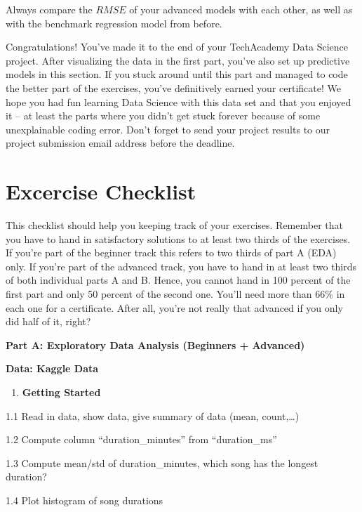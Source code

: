 \documentclass[
  11pt,
]{book}
\providecommand{\tightlist}{%
  \setlength{\itemsep}{0pt}\setlength{\parskip}{0pt}}
\begin{document}
Always compare the \(RMSE\) of your advanced models with each other, as well as with the benchmark regression model from before.

Congratulations! You've made it to the end of your TechAcademy Data Science project. After visualizing the data in the first part, you've also set up predictive models in this section. If you stuck around until this part and managed to code the better part of the exercises, you've definitively earned your certificate! We hope you had fun learning Data Science with this data set and that you enjoyed it -- at least the parts where you didn't get stuck forever because of some unexplainable coding error. Don't forget to send your project results to our project submission email address before the deadline.

\newpage

\hypertarget{excercise-checklist}{%
\chapter{Excercise Checklist}\label{excercise-checklist}}

This checklist should help you keeping track of your exercises. Remember that you have to hand in satisfactory solutions to at least two thirds of the exercises. If you're part of the beginner track this refers to two thirds of part A (EDA) only. If you're part of the advanced track, you have to hand in at least two thirds of both individual parts A and B. Hence, you cannot hand in 100 percent of the first part and only 50 percent of the second one. You'll need more than 66\% in each one for a certificate. After all, you're not really that advanced if you only did half of it, right?

\textbf{Part A: Exploratory Data Analysis (Beginners + Advanced)}

\textbf{Data: Kaggle Data}

\begin{enumerate}
\def\labelenumi{\arabic{enumi}.}
\tightlist
\item
  \textbf{Getting Started}
\end{enumerate}

1.1 Read in data, show data, give summary of data (mean, count,\ldots)

1.2 Compute column ``duration\_minutes'' from ``duration\_ms''

1.3 Compute mean/std of duration\_minutes, which song has the longest duration?

1.4 Plot histogram of song durations
\end{document}
